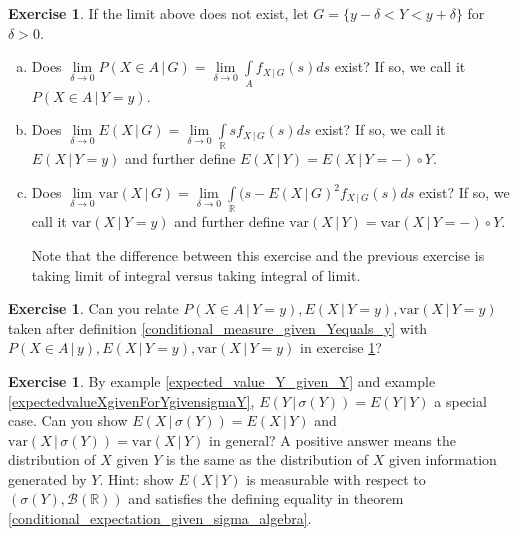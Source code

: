 \documentclass[12pt]{amsart}
\theoremstyle{definition}
\newtheorem{exercise}[theorem]{Exercise}
\begin{document}
\begin{exercise} \label{condition_Y_equals_y_via_limit} If the limit above does not exist, let $G = \{y - \delta < Y < y + \delta\}$ for $\delta > 0$.
\begin{enumerate}[a.]
\item Does $\lim\limits_{\delta \to 0} P(X \in A \,|\, G) = \lim\limits_{\delta \to 0} \int\limits_A f_{X \,|\, G}(s)ds$ exist? If so, we call it $P(X \in A \,|\, Y = y)$.
\item Does $\lim\limits_{\delta \to 0} E(X \,|\, G) = \lim\limits_{\delta \to 0} \int\limits_{\mathbb{R}} sf_{X \,|\, G}(s)ds$ exist? If so, we call it $E(X \,|\, Y = y)$ and further define $E(X \,|\, Y) = E(X \,|\, Y = -) \circ Y$.
\item Does $\lim\limits_{\delta \to 0} \text{var}(X \,|\, G) = \lim\limits_{\delta \to 0} \int\limits_{\mathbb{R}} (s - E(X \,|\, G)^2 f_{X \,|\, G}(s)ds$ exist? If so, we call it $\text{var}(X \,|\, Y = y)$ and further define $\text{var}(X \,|\, Y) = \text{var}(X \,|\, Y = -) \circ Y$.

Note that the difference between this exercise and the previous exercise is taking limit of integral versus taking integral of limit.
\end{enumerate}
\end{exercise}

\begin{exercise} Can you relate $P(X \in A \,|\, Y = y), E(X \,|\, Y = y), \text{var}(X \,|\, Y = y)$ taken after definition \ref{conditional_measure_given_Yequals_y} with $P(X \in A \,|\, y), E(X \,|\, Y = y), \text{var}(X \,|\, Y = y)$ in exercise \ref{condition_Y_equals_y_via_limit}?
\end{exercise}

\begin{exercise} \label{given_sigma_algebra_of_Y_vs_given_Y} By example \ref{expected_value_Y_given_Y} and example \ref{expectedvalueXgivenForYgivensigmaY}, $E(Y \,|\, \sigma(Y)) = E(Y \,|\, Y)$ a special case. Can you show $E(X \,|\, \sigma(Y)) = E(X \,|\, Y)$ and $\text{var}(X \,|\, \sigma(Y)) = \text{var}(X \,|\, Y)$ in general? A positive answer means the distribution of $X$ given $Y$ is the same as the distribution of $X$ given information generated by $Y$. Hint: show $E(X \,|\, Y)$ is measurable with respect to $(\sigma(Y), \mathcal{B}(\mathbb{R}))$ and satisfies the defining equality in theorem \ref{conditional_expectation_given_sigma_algebra}.
\end{exercise}
\end{document}
